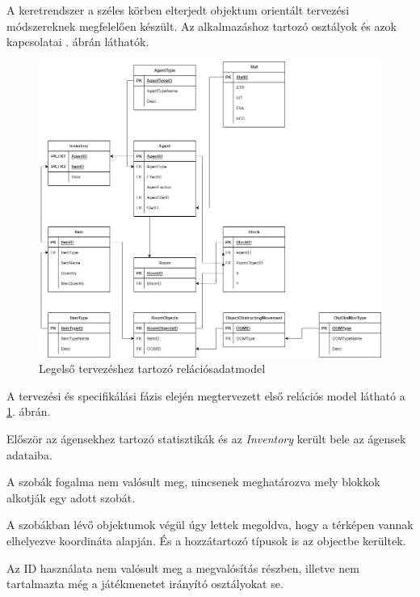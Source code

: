 

A keretrendszer a széles körben elterjedt objektum orientált tervezési módszereknek megfelelően készült. Az alkalmazáshoz tartozó osztályok és azok kapcsolatai . ábrán láthatók.

\begin{figure}[!ht]
    \centering
    \includegraphics[width=\textwidth]{images/relaciosadatmodel7.png}
    \caption{Legelső tervezéshez tartozó relációsadatmodel}
    \label{fig:relmod}
\end{figure}

\newpage

A tervezési és specifikálási fázis elején megtervezett első relációs model látható a \ref{fig:relmod}. ábrán.

Először az ágensekhez tartozó statisztikák és az \textit{Inventory} került bele az ágensek adataiba.

A szobák fogalma nem valósult meg, nincsenek meghatározva mely blokkok alkotják egy adott szobát.

A szobákban lévő objektumok végül úgy lettek megoldva, hogy a térképen vannak elhelyezve koordináta alapján. És a hozzátartozó típusok is az objectbe kerültek.

Az ID használata nem valósult meg a megvalósítás részben, illetve nem tartalmazta még a játékmenetet irányító osztályokat se.

